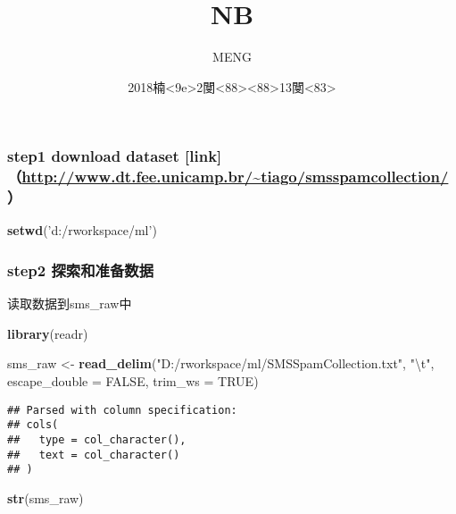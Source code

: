 \documentclass[]{article}
\title{NB}
\author{MENG}
\date{2018楠\textless{}9e\textgreater{}2閺\textless{}88\textgreater{}\textless{}88\textgreater{}13閺\textless{}83\textgreater{}}
\newenvironment{Shaded}{\begin{snugshade}}{\end{snugshade}}
\newcommand{\KeywordTok}[1]{\textcolor[rgb]{0.13,0.29,0.53}{\textbf{#1}}}
\newcommand{\DataTypeTok}[1]{\textcolor[rgb]{0.13,0.29,0.53}{#1}}
\newcommand{\CharTok}[1]{\textcolor[rgb]{0.31,0.60,0.02}{#1}}
\newcommand{\StringTok}[1]{\textcolor[rgb]{0.31,0.60,0.02}{#1}}
\newcommand{\OtherTok}[1]{\textcolor[rgb]{0.56,0.35,0.01}{#1}}
\newcommand{\NormalTok}[1]{#1}
\begin{document}
\maketitle

\subsubsection{\texorpdfstring{step1 download dataset
{[}link{]}（\url{http://www.dt.fee.unicamp.br/~tiago/smsspamcollection/}）}{step1 download dataset {[}link{]}（http://www.dt.fee.unicamp.br/\textasciitilde{}tiago/smsspamcollection/）}}\label{step1-download-dataset-linkhttpwww.dt.fee.unicamp.brtiagosmsspamcollection}

\begin{Shaded}
\begin{Highlighting}[]
\KeywordTok{setwd}\NormalTok{(}\StringTok{'d:/rworkspace/ml'}\NormalTok{)}
\end{Highlighting}
\end{Shaded}

\subsubsection{step2 探索和准备数据}\label{step2-}

读取数据到sms\_raw中

\begin{Shaded}
\begin{Highlighting}[]
\KeywordTok{library}\NormalTok{(readr)}

\NormalTok{sms_raw <-}\StringTok{ }\KeywordTok{read_delim}\NormalTok{(}\StringTok{"D:/rworkspace/ml/SMSSpamCollection.txt"}\NormalTok{, }\StringTok{"}\CharTok{\textbackslash{}t}\StringTok{"}\NormalTok{, }\DataTypeTok{escape_double =} \OtherTok{FALSE}\NormalTok{, }\DataTypeTok{trim_ws =} \OtherTok{TRUE}\NormalTok{)}
\end{Highlighting}
\end{Shaded}

\begin{verbatim}
## Parsed with column specification:
## cols(
##   type = col_character(),
##   text = col_character()
## )
\end{verbatim}

\begin{Shaded}
\begin{Highlighting}[]
\KeywordTok{str}\NormalTok{(sms_raw)}
\end{Highlighting}
\end{Shaded}
\end{document}
